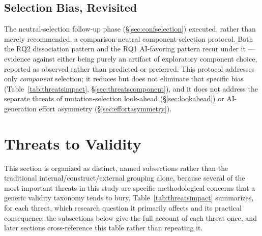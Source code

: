 \documentclass[10pt,conference]{IEEEtran}
\begin{document}
\subsection{Selection Bias, Revisited}
The neutral-selection follow-up phase (\S\ref{sec:confselection}) executed, rather than merely recommended, a comparison-neutral component-selection protocol. Both the RQ2 dissociation pattern and the RQ1 AI-favoring pattern recur under it — evidence against either being purely an artifact of exploratory component choice, reported as observed rather than predicted or preferred. This protocol addresses only \emph{component} selection; it reduces but does not eliminate that specific bias (Table~\ref{tab:threatsimpact}, \S\ref{sec:threatscomponent}), and it does not address the separate threats of mutation-selection look-ahead (\S\ref{sec:lookahead}) or AI-generation effort asymmetry (\S\ref{sec:effortasymmetry}).

\section{Threats to Validity}
\label{sec:threats}
This section is organized as distinct, named subsections rather than the traditional internal/construct/external grouping alone, because several of the most important threats in this study are specific methodological concerns that a generic validity taxonomy tends to bury. Table~\ref{tab:threatsimpact} summarizes, for each threat, which research question it primarily affects and its practical consequence; the subsections below give the full account of each threat once, and later sections cross-reference this table rather than repeating it.
\end{document}
